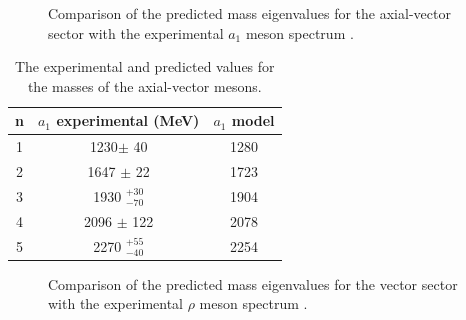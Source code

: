 \documentclass[aps,prd,12pt,nofootinbib]{revtex4}
\begin{document}
\begin{figure}[htb]
\caption{Comparison of the predicted mass eigenvalues for the axial-vector sector with the experimental $a_1$ meson spectrum \cite{PDG}.}
\end{figure}

\begin{table}[htb]
\center
\begin{tabular}{| c || c | c  |}
\hline
n & $a_1$ experimental (MeV) & $a_1$ model \\
\hline
1 & 1230$\pm$ 40 &	    	1280	 \\
2 & 1647 $\pm$ 22 & 	1723	 \\
3 & 1930  $^{+30}_{-70}$ & 1904\\
4 & 2096 $\pm$ 122 &      2078	 \\ 
5 & 2270 $^{+55}_{-40}$  & 2254\\
\hline
\end{tabular}
\caption{The experimental and predicted values for the masses of the axial-vector mesons.}
\label{tabAxial}
\end{table}

\begin{figure}[htb]
\caption{Comparison of the predicted mass eigenvalues for the vector sector with the experimental $\rho$ meson spectrum \cite{PDG}.}
\label{figRho}
\end{figure}
\end{document}
